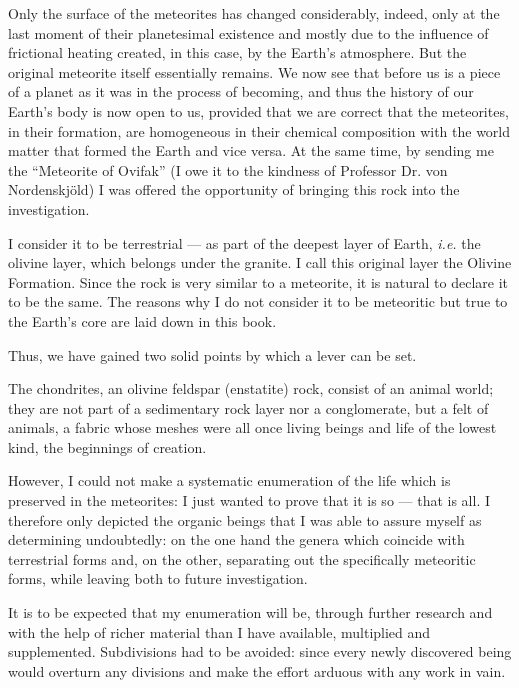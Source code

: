 \documentclass[a4paper, 12pt, oneside]{article}
\begin{document}
Only the surface of the meteorites has changed considerably, indeed, only at the last moment of their planetesimal existence and mostly due to the influence of frictional heating created, in this case, by the Earth's atmosphere. But the original meteorite itself essentially remains. We now see that before us is a piece of a planet as it was in the process of becoming, and thus the history of our Earth's body is now open to us, provided that we are correct that the meteorites, in their formation, are homogeneous in their chemical composition with the world matter that formed the Earth and vice versa. At the same time, by sending me the ``Meteorite of Ovifak'' (I owe it to the kindness of Professor Dr. von Nordenskjöld) I was offered the opportunity of bringing this rock into the investigation.

I consider it to be terrestrial --- as part of the deepest layer of Earth, \emph{i.e.} the olivine layer, which belongs under the granite. I call this original layer the Olivine Formation. Since the rock is very similar to a meteorite, it is natural to declare it to be the same. The reasons why I do not consider it to be meteoritic but true to the Earth's core are laid down in this book.

Thus, we have gained two solid points by which a lever can be set.

The chondrites, an olivine feldspar (enstatite) rock, consist of an animal world; they are not part of a sedimentary rock layer nor a conglomerate, but a felt of animals, a fabric whose meshes were all once living beings and life of the lowest kind, the beginnings of creation.

However, I could not make a systematic enumeration of the life which is preserved in the meteorites: I just wanted to prove that it is so --- that is all. I therefore only depicted the organic beings that I was able to assure myself as determining undoubtedly: on the one hand the genera which coincide with terrestrial forms and, on the other, separating out the specifically meteoritic forms, while leaving both to future investigation.

It is to be expected that my enumeration will be, through further research and with the help of richer material than I have available, multiplied and supplemented. Subdivisions had to be avoided: since every newly discovered being would overturn any divisions and make the effort arduous with any work in vain.
\end{document}
